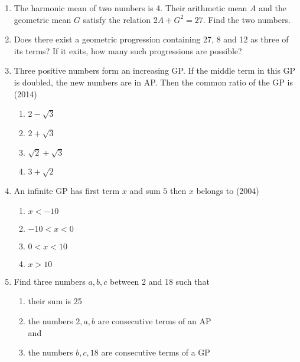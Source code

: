 \begin{enumerate}[label=\thesubsection.\arabic*,ref=\thesubsection.\theenumi]
\begin{multicols}{4}
\begin{enumerate}
            \item $a=3, r=1/4$
            \end{enumerate}
            \end{multicols}
    \item The harmonic mean of two numbers is 4. Their arithmetic mean $A$ and the geometric mean $G$ satisfy the relation
    $2A + G^2 = 27$.
    Find the two numbers.  \hfill{}
    \item Does there exist a geometric progression containing 27,  8 and 12 as three of its terms? If it exits,  how many such progressions are possible?  \hfill{}
    \item Three positive numbers form an increasing GP. If the middle term in this GP is doubled,  the new numbers are in AP. Then the common ratio of the GP is 
%    
    \hfill(2014)
    \begin{multicols}{4}
\begin{enumerate}    
    \item$2-\sqrt{3}$
    \item$2+\sqrt{3}$
    \item$\sqrt{2}+\sqrt{3}$
    \item$3+\sqrt{2}$ 
    \end{enumerate}
\end{multicols}
%
\item An infinite GP has first term $x$ and sum $5$ then $x$ belongs to \hfill(2004)
            \begin{multicols}{4}
\begin{enumerate}    
                \item $x<-10$
                \item $-10<x<0$
                \item $0<x<10$
                \item $x>10$
                \end{enumerate}
                \end{multicols}
    \item Find three numbers $a, b, c$ between 2 and 18 such that
\begin{enumerate}    
    \item their sum is 25
    \item the numbers $2, a, b$ are consecutive terms of an AP
    \\
    and
    \item the numbers $b, c, 18$ are consecutive terms of a GP\hfill{}
    \end{enumerate}

\end{enumerate}
